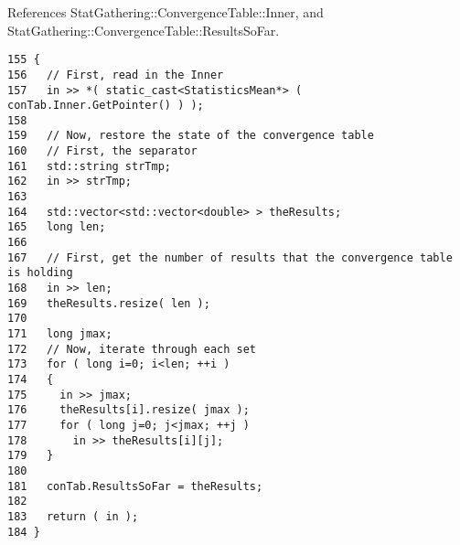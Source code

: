 References StatGathering::ConvergenceTable::Inner, and StatGathering::ConvergenceTable::ResultsSoFar.

\begin{Code}\begin{verbatim}155 {
156   // First, read in the Inner
157   in >> *( static_cast<StatisticsMean*> ( conTab.Inner.GetPointer() ) );
158 
159   // Now, restore the state of the convergence table
160   // First, the separator
161   std::string strTmp;
162   in >> strTmp;
163 
164   std::vector<std::vector<double> > theResults;
165   long len;
166 
167   // First, get the number of results that the convergence table is holding
168   in >> len;
169   theResults.resize( len );
170 
171   long jmax;
172   // Now, iterate through each set
173   for ( long i=0; i<len; ++i )
174   {
175     in >> jmax;
176     theResults[i].resize( jmax );
177     for ( long j=0; j<jmax; ++j )
178       in >> theResults[i][j];
179   }
180 
181   conTab.ResultsSoFar = theResults;
182 
183   return ( in );
184 }
\end{verbatim}
\end{Code}


